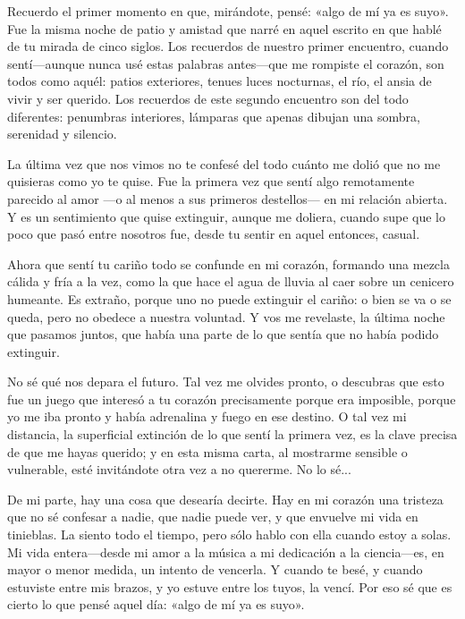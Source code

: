 \documentclass[a4paper, 12pt]{article}
\begin{document}
Recuerdo el primer momento en que, mirándote, pensé: «algo de mí ya es
suyo». Fue la misma noche de patio y amistad que narré en aquel escrito en que
hablé de tu mirada de cinco siglos. Los recuerdos de nuestro primer encuentro,
cuando sentí---aunque nunca usé estas palabras antes---que me rompiste el
corazón, son todos como aquél: patios exteriores, tenues luces nocturnas, el
río, el ansia de vivir y ser querido. Los recuerdos de este segundo encuentro
son del todo diferentes: penumbras interiores, lámparas que apenas dibujan una
sombra, serenidad y silencio.

La última vez que nos vimos no te confesé del todo cuánto me dolió que no me
quisieras como yo te quise. Fue la primera vez que sentí algo remotamente
parecido al amor ---o al menos a sus primeros destellos--- en mi relación
abierta. Y es un sentimiento que quise extinguir, aunque me doliera, cuando supe
que lo poco que pasó entre nosotros fue, desde tu sentir en aquel entonces,
casual. 

Ahora que sentí tu cariño todo se confunde en mi corazón, formando una mezcla
cálida y fría a la vez, como la que hace el agua de lluvia al caer sobre un
cenicero humeante. Es extraño, porque uno no puede extinguir el cariño: o bien
se va o se queda, pero no obedece a nuestra voluntad. Y vos me revelaste, la
última noche que pasamos juntos, que había una parte de lo que sentía que no
había podido extinguir. 

No sé qué nos depara el futuro. Tal vez me olvides pronto, o descubras que esto
fue un juego que interesó a tu corazón precisamente porque era imposible, porque
yo me iba pronto y había adrenalina y fuego en ese destino. O tal vez mi
distancia, la superficial extinción de lo que sentí la primera vez, es la clave
precisa de que me hayas querido; y en esta misma carta, al mostrarme sensible o
vulnerable, esté invitándote otra vez a no quererme. No lo sé... 

De mi parte, hay una cosa que desearía decirte. Hay en mi corazón una tristeza
que no sé confesar a nadie, que nadie puede ver, y que envuelve mi vida en
tinieblas. La siento todo el tiempo, pero sólo hablo con ella cuando estoy a
solas. Mi vida entera---desde mi amor a la música a mi dedicación a la
ciencia---es, en mayor o menor medida, un intento de vencerla. Y cuando te besé,
y cuando estuviste entre mis brazos, y yo estuve entre los tuyos, la vencí. Por
eso sé que es cierto lo que pensé aquel día: «algo de mí ya es suyo».
\end{document}
